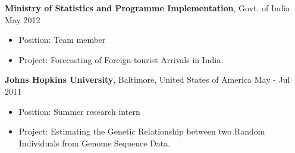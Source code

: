 \documentclass[10pt]{article}
\newenvironment{innerlist}[1][\enskip\textbullet]%
        {\begin{itemize}[#1,leftmargin=*,parsep=0pt,itemsep=0pt,topsep=0pt,partopsep=0pt]}
        {\end{itemize}}
\newcommand{\halfblankline}{\quad\vspace{-0.5\baselineskip}\pagebreak[3]}
\begin{document}
\halfblankline

{\bf Ministry of Statistics and Programme Implementation}, Govt. of India  \hfill May 2012
\vspace{0.03in}
\begin{innerlist}
\item {Position}: Team member
\item {Project}: Forecasting of Foreign-tourist Arrivals in India.
\end{innerlist}

\halfblankline

{\bf Johns Hopkins University}, Baltimore, United States of America    \hfill May - Jul 2011
\vspace{0.03in}
\begin{innerlist}
\item {Position}: Summer research intern
\item {Project}: Estimating the Genetic Relationship between two Random Individuals from Genome Sequence Data.
\end{innerlist}
\end{document}
